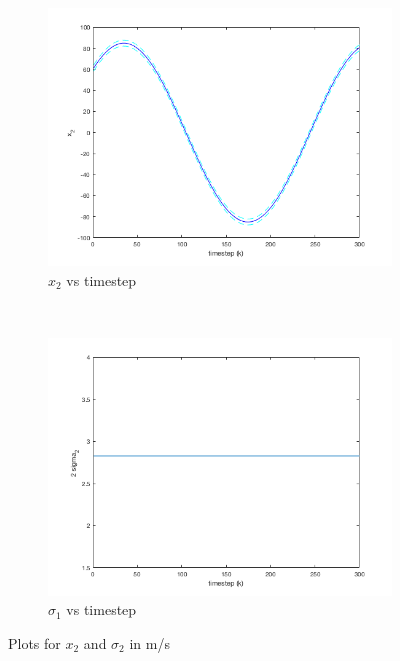 \documentclass[11pt]{article}
\begin{document}
\begin{figure}
\centering
\begin{subfigure}[b]{.45\textwidth}
	\centering
	\includegraphics[width=\textwidth]{p1_plt3.png}
	\caption{$x_2$ vs timestep}
	\label{x2}
\end{subfigure}
~
\begin{subfigure}[b]{.45\textwidth}
	\centering
	\includegraphics[width=\textwidth]{p1_plt4.png}
	\caption{$\sigma_1$ vs timestep}
	\label{sigma2}
\end{subfigure}
\caption{Plots for $x_2$ and $\sigma_2$ in m/s}
\label{x2plots}
\end{figure}
\end{document}
